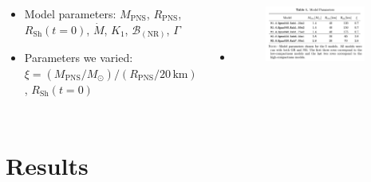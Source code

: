 \documentclass{beamer}
\newcommand{\msun}{M_{\odot}}
\newcommand{\nr}{\mathrm{NR}}
\newcommand{\mpns}{M_{\mathrm{PNS}}}
\newcommand{\rpns}{R_{\mathrm{PNS}}}
\newcommand{\rsh}{R_{\mathrm{Sh}}}
\newcommand{\mdot}{\dot{M}}
\begin{document}
\begin{frame}

  \begin{columns}[c]


      \begin{itemize}[<+->]
        \item[]
          Model parameters:
          $\mpns$, $\rpns$, $\rsh\left(t=0\right)$, $\mdot$, $K_{1}$,
          $\mathcal{B}_{\left(\nr\right)}$, $\Gamma$\vspace{1em}
        \item[]
          Parameters we varied:
          $\xi=\left(\mpns/\msun\right)/\left(\rpns/20\,\mathrm{km}\right)$
          \citep{oo2011},
          $\rsh\left(t=0\right)$
      \end{itemize}


      \begin{itemize}[<+->]
        \item[]
            \begin{figure}[ht]
              \centering
              \includegraphics[width=0.9\textwidth]{fig.paramspace.png}
          \end{figure}
      \end{itemize}

  \end{columns}

\end{frame}

\section{Results}
\end{document}
